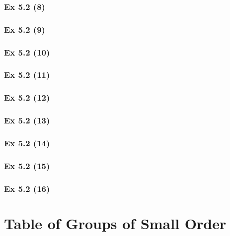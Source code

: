\subsubsection{Ex 5.2 (8)}\label{sec:Ex_5.2.8}

\subsubsection{Ex 5.2 (9)}\label{sec:Ex_5.2.9}

\subsubsection{Ex 5.2 (10)}\label{sec:Ex_5.2.10}

\newpage		%

\subsubsection{Ex 5.2 (11)}\label{sec:Ex_5.2.11}

\subsubsection{Ex 5.2 (12)}\label{sec:Ex_5.2.12}

\subsubsection{Ex 5.2 (13)}\label{sec:Ex_5.2.13}

\subsubsection{Ex 5.2 (14)}\label{sec:Ex_5.2.14}

\subsubsection{Ex 5.2 (15)}\label{sec:Ex_5.2.15}

\subsubsection{Ex 5.2 (16)}\label{sec:Ex_5.2.16}

\newpage		%

\section{Table of Groups of Small Order}\label{sec:5.3}	
